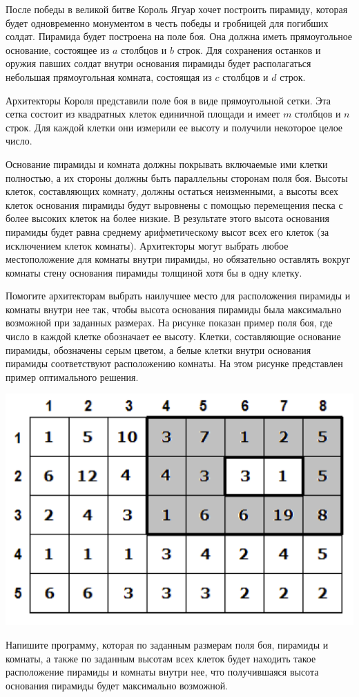 После победы в великой битве Король Ягуар хочет построить пирамиду, которая будет
одновременно монументом в честь победы и гробницей для погибших солдат. Пирамида
будет построена на поле боя. Она должна иметь прямоугольное основание, состоящее из $a$ столбцов и $b$ строк. Для сохранения останков и оружия павших солдат внутри основания пирамиды будет располагаться небольшая прямоугольная комната, состоящая из $c$ столбцов и $d$ строк.

Архитекторы Короля представили поле боя в виде прямоугольной сетки. Эта сетка состоит из квадратных клеток единичной площади и имеет $m$ столбцов и $n$ строк. Для каждой клетки они измерили ее высоту и получили некоторое целое число.

Основание пирамиды и комната должны покрывать включаемые ими клетки полностью, а их
стороны должны быть параллельны сторонам поля боя. Высоты клеток, составляющих
комнату, должны остаться неизменными, а высоты всех клеток основания пирамиды будут
выровнены с помощью перемещения песка с более высоких клеток на более низкие. В
результате этого высота основания пирамиды будет равна среднему арифметическому
высот всех его клеток (за исключением клеток комнаты). Архитекторы могут выбрать любое
местоположение для комнаты внутри пирамиды, но обязательно оставлять вокруг комнаты
стену основания пирамиды толщиной хотя бы в одну клетку.

Помогите архитекторам выбрать наилучшее место для расположения пирамиды и комнаты внутри нее так, чтобы высота основания пирамиды была максимально возможной при заданных размерах. На рисунке показан пример поля боя, где число в каждой клетке обозначает ее высоту. Клетки, составляющие основание пирамиды, обозначены серым цветом, а белые клетки внутри основания пирамиды соответствуют расположению комнаты. На этом рисунке представлен пример оптимального решения.

\includegraphics{piramida.png}


Напишите программу, которая по заданным размерам поля боя, пирамиды и комнаты, а
также по заданным высотам всех клеток будет находить такое расположение пирамиды и
комнаты внутри нее, что получившаяся высота основания пирамиды будет максимально
возможной. 